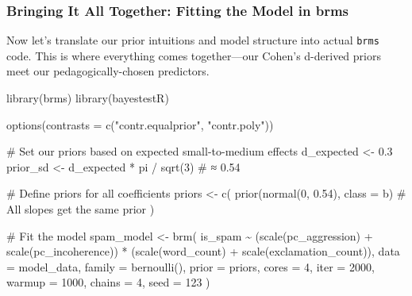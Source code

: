 \documentclass[
  letterpaper,
  DIV=11,
  numbers=noendperiod]{scrartcl}
\newenvironment{Shaded}{\begin{snugshade}}{\end{snugshade}}
\newcommand{\AttributeTok}[1]{\textcolor[rgb]{0.40,0.45,0.13}{#1}}
\newcommand{\CommentTok}[1]{\textcolor[rgb]{0.37,0.37,0.37}{#1}}
\newcommand{\DecValTok}[1]{\textcolor[rgb]{0.68,0.00,0.00}{#1}}
\newcommand{\FloatTok}[1]{\textcolor[rgb]{0.68,0.00,0.00}{#1}}
\newcommand{\FunctionTok}[1]{\textcolor[rgb]{0.28,0.35,0.67}{#1}}
\newcommand{\NormalTok}[1]{\textcolor[rgb]{0.00,0.23,0.31}{#1}}
\newcommand{\OtherTok}[1]{\textcolor[rgb]{0.00,0.23,0.31}{#1}}
\newcommand{\SpecialCharTok}[1]{\textcolor[rgb]{0.37,0.37,0.37}{#1}}
\newcommand{\StringTok}[1]{\textcolor[rgb]{0.13,0.47,0.30}{#1}}
\begin{document}
\subsubsection{Bringing It All Together: Fitting the Model in
brms}\label{bringing-it-all-together-fitting-the-model-in-brms}

Now let's translate our prior intuitions and model structure into actual
\texttt{brms} code. This is where everything comes together---our
Cohen's d-derived priors meet our pedagogically-chosen predictors.

\begin{Shaded}
\begin{Highlighting}[]
\FunctionTok{library}\NormalTok{(brms)}
\FunctionTok{library}\NormalTok{(bayestestR)}

\FunctionTok{options}\NormalTok{(}\AttributeTok{contrasts =} \FunctionTok{c}\NormalTok{(}\StringTok{"contr.equalprior"}\NormalTok{, }\StringTok{"contr.poly"}\NormalTok{))}

\CommentTok{\# Set our priors based on expected small{-}to{-}medium effects}
\NormalTok{d\_expected }\OtherTok{\textless{}{-}} \FloatTok{0.3}
\NormalTok{prior\_sd }\OtherTok{\textless{}{-}}\NormalTok{ d\_expected }\SpecialCharTok{*}\NormalTok{ pi }\SpecialCharTok{/} \FunctionTok{sqrt}\NormalTok{(}\DecValTok{3}\NormalTok{)  }\CommentTok{\# ≈ 0.54}

\CommentTok{\# Define priors for all coefficients}
\NormalTok{priors }\OtherTok{\textless{}{-}} \FunctionTok{c}\NormalTok{(}
  \FunctionTok{prior}\NormalTok{(}\FunctionTok{normal}\NormalTok{(}\DecValTok{0}\NormalTok{, }\FloatTok{0.54}\NormalTok{), }\AttributeTok{class =}\NormalTok{ b)  }\CommentTok{\# All slopes get the same prior}
\NormalTok{)}

\CommentTok{\# Fit the model}
\NormalTok{spam\_model }\OtherTok{\textless{}{-}} \FunctionTok{brm}\NormalTok{(        }
\NormalTok{  is\_spam }\SpecialCharTok{\textasciitilde{}}\NormalTok{ (}\FunctionTok{scale}\NormalTok{(pc\_aggression) }\SpecialCharTok{+} \FunctionTok{scale}\NormalTok{(pc\_incoherence)) }\SpecialCharTok{*} 
\NormalTok{            (}\FunctionTok{scale}\NormalTok{(word\_count) }\SpecialCharTok{+} \FunctionTok{scale}\NormalTok{(exclamation\_count)),}
  \AttributeTok{data =}\NormalTok{ model\_data,}
  \AttributeTok{family =} \FunctionTok{bernoulli}\NormalTok{(),}
  \AttributeTok{prior =}\NormalTok{ priors,}
  \AttributeTok{cores =} \DecValTok{4}\NormalTok{,}
  \AttributeTok{iter =} \DecValTok{2000}\NormalTok{,}
  \AttributeTok{warmup =} \DecValTok{1000}\NormalTok{,}
  \AttributeTok{chains =} \DecValTok{4}\NormalTok{,}
  \AttributeTok{seed =} \DecValTok{123}
\NormalTok{)}
\end{Highlighting}
\end{Shaded}
\end{document}
